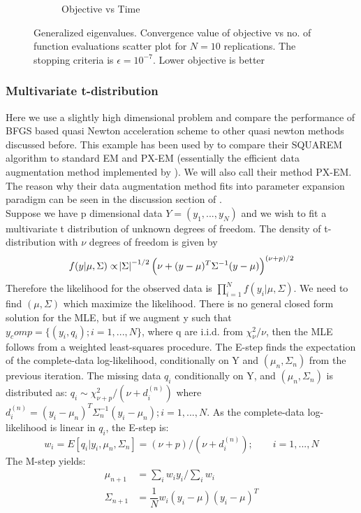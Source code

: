 \documentclass[12pt]{article}
\begin{document}
\begin{figure}
\begin{subfigure}[h]{0.45\textwidth}
        \caption{Objective vs Time}
        \label{subfig:eigen-objVSeval}
    \end{subfigure}
    \caption{Generalized eigenvalues. Convergence value of objective vs no. of function evaluations scatter plot for $N=10$ replications. The stopping criteria is $\epsilon  = 10^{-7}$. Lower objective is better }
    \label{fig:eigen-sp}
\end{figure}


 \subsubsection{Multivariate t-distribution} \label{ex:multi.t.distr}
 
 Here we use a slightly high dimensional problem and compare the performance of BFGS based quasi Newton acceleration scheme to other quasi newton methods discussed before. This example has been used by \cite{varadhan2008simple} to compare their SQUAREM algorithm to standard EM and PX-EM (essentially the efficient data augmentation method implemented by \cite{meng1997algorithm}). We will also call their method PX-EM. The reason why their data augmentation method fits into parameter expansion paradigm can be seen in the discussion section of \cite{varadhan2008simple}. \\
 
 Suppose we have p dimensional data $Y = (y_1, ..., y_N)$ and we wish to fit a multivariate t distribution of unknown degrees of freedom. The density of t-distribution with $\nu$ degrees of freedom is given by 
 \[
 f(y| \mu, \Sigma) \propto \abs{\Sigma}^{-1/2} \left(\nu + (y - \mu)^T \Sigma^{-1} (y - \mu)\right)^{(\nu + p)/2}
 \]
 Therefore the likelihood for the observed data is $\prod_{i=1}^{N}f(y_i | \mu, \Sigma)$. We need to find $(\mu, \Sigma)$ which maximize the likelihood. There is no general closed form solution for the MLE, but if we augment y such that $y_comp = \{(y_i, q_i); i = 1, ..., N\}$, where q are i.i.d. from $\chi^2_\nu / \nu$, then the MLE follows from a weighted least-squares procedure. The E-step finds the expectation of the complete-data log-likelihood, conditionally on Y and $(\mu_n, \Sigma_n)$ from the previous iteration. The missing data $q_i$ conditionally on Y, and $(\mu_n, \Sigma_n)$ is distributed as: $q_i \sim \chi^2_{\nu +p}/(\nu + d_i^{(n)})$ where $d_i^{(n)} = (y_i - \mu_n)^T \Sigma_n^{-1} (y_i - \mu_n); i= 1,..., N$. As the complete-data log-likelihood is linear in $q_i$, the E-step is:
 \[
 w_i = E[q_i | y_i, \mu_n, \Sigma_n] = (\nu + p)/(\nu + d_i^{(n)}); \qquad i = 1, ..., N
 \]
 The M-step yields:
 \begin{align*}
     \mu_{n+1} &=\sum_{i}w_i y_i \bigg / \sum_{i}w_i \\
     \Sigma_{n+1} &= \dfrac{1}{N} w_i (y_i - \mu)(y_i - \mu)^T
 \end{align*}
 
\end{document}
